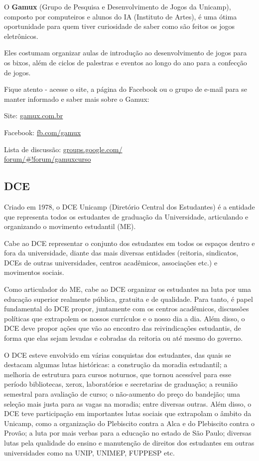 O \textbf{Gamux} (Grupo de Pesquisa e Desenvolvimento de Jogos da Unicamp), composto por
computeiros e alunos do IA (Instituto de Artes), é uma ótima oportunidade para
quem tiver curiosidade de saber como são feitos os jogos eletrônicos.

Eles costumam organizar aulas de introdução ao desenvolvimento de jogos para os bixos,
além de ciclos de palestras e eventos ao longo do ano para a confecção de jogos.

Fique atento - acesse o site, a página do Facebook ou o grupo de e-mail para se manter
informado e saber mais sobre o Gamux:

\begin{compactitemize}
    \item  Site: \url{gamux.com.br}
    \item  Facebook: \url{fb.com/gamux}
    \item  Lista de discussão: \url{groups.google.com/}\\\url{forum/#!forum/gamuxcurso}
\end{compactitemize}

\subsection{DCE}

Criado em 1978, o DCE Unicamp (Diretório Central dos Estudantes) é a entidade
que representa todos os estudantes de graduação da Universidade, articulando e
organizando o movimento estudantil (ME).

Cabe ao DCE representar o conjunto dos estudantes em todos os espaços dentro e
fora da universidade, diante das mais diversas entidades (reitoria, sindicatos,
DCEs de outras universidades, centros acadêmicos, associações etc.) e movimentos
sociais.

Como articulador do ME, cabe ao DCE organizar os estudantes na luta por uma
educação superior realmente pública, gratuita e de qualidade. Para tanto, é
papel fundamental do DCE propor, juntamente com os centros acadêmicos,
discussões políticas que extrapolem os nossos currículos e o nosso dia a dia.
Além disso, o DCE deve propor ações que vão ao encontro das reivindicações
estudantis, de forma que elas sejam levadas e cobradas da reitoria ou até mesmo
do governo.

O DCE esteve envolvido em várias conquistas dos estudantes, das quais se
destacam algumas lutas históricas: a construção da moradia estudantil; a
melhoria de estrutura para cursos noturnos, que tornou acessível para esse
período bibliotecas, xerox, laboratórios e secretarias de graduação; a reunião
semestral para avaliação de curso; o não-aumento do preço do bandejão; uma
seleção mais justa para as vagas na moradia; entre diversas outras. Além disso,
o DCE teve participação em importantes lutas sociais que extrapolam o âmbito da
Unicamp, como a organização do Plebiscito contra a Alca e do Plebiscito contra o
Provão; a luta por mais verbas para a educação no estado de São Paulo; diversas
lutas pela qualidade do ensino e manutenção de direitos dos estudantes em outras
universidades como na UNIP, UNIMEP, FUPPESP etc.

